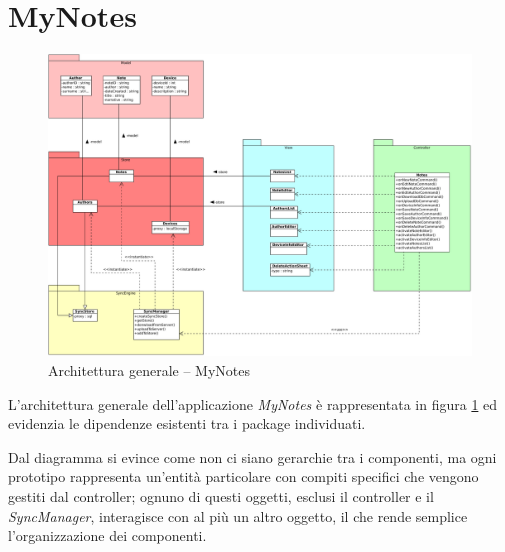 \section{MyNotes}
\begin{figure}[htbp]
\centering
\includegraphics[scale=0.5,angle=90]{gfx/class/MyNotes.pdf}
\caption{Architettura generale -- MyNotes}
\label{fig:architettura MyNotes}
\end{figure}
L'architettura generale dell'applicazione \emph{MyNotes} è rappresentata in figura \ref{fig:architettura MyNotes} ed evidenzia le dipendenze esistenti tra i package individuati.

Dal diagramma si evince come non ci siano gerarchie tra i componenti, ma ogni prototipo rappresenta un'entità particolare con compiti specifici che vengono gestiti dal controller; ognuno di questi oggetti, esclusi il controller e il \emph{SyncManager}, interagisce con al più un altro oggetto, il che rende semplice l'organizzazione dei componenti.

